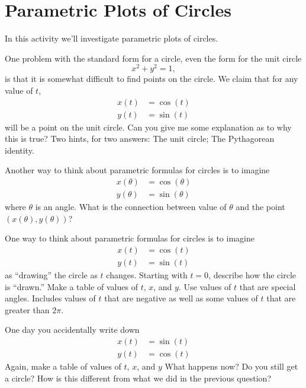 
\newpage

\section{Parametric Plots of Circles}

In this activity we'll investigate parametric plots of circles.



\begin{prob} 
One problem with the standard form for a circle, even the form for the unit circle
\[
x^2 + y^2 = 1,
\]
is that it is somewhat difficult to find points on the circle. We
claim that for any value of $t$,
\begin{align*}
x(t) &= \cos(t)\\
y(t) &= \sin(t) 
\end{align*}
will be a point on the unit circle. Can you give me some explanation
as to why this is true? Two hints, for two answers: The unit circle;
The Pythagorean identity.
\end{prob} 

\begin{prob}
Another way to think about parametric formulas for circles is to imagine 
\begin{align*}
x(\theta) &= \cos(\theta)\\
y(\theta) &= \sin(\theta) 
\end{align*}
where $\theta$ is an angle. What is the connection between value of
$\theta$ and the point $(x(\theta), y(\theta))$?
\end{prob}

\begin{prob}
One way to think about parametric formulas for circles is to imagine 
\begin{align*}
x(t) &= \cos(t)\\
y(t) &= \sin(t) 
\end{align*}
as ``drawing'' the circle as $t$ changes. Starting with $t=0$,
describe how the circle is ``drawn.''  Make a table of values of $t$, $x$, and $y$.  Use values of $t$ that are special angles.  Includes values of $t$ that are negative as well as some values of $t$ that are greater than $2\pi$.  
\end{prob}

\begin{prob}
One day you accidentally write down
\begin{align*}
x(t) &= \sin(t)\\
y(t) &= \cos(t) 
\end{align*}
Again, make a table of values of $t$, $x$, and $y$
What happens now? Do you still get a circle? How is this different
from what we did in the previous question?
\end{prob}

